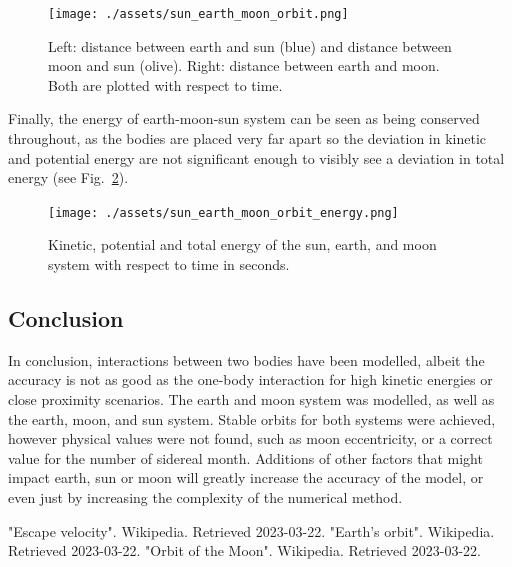 \documentclass[hyphens,twocolumn,nobalancelastpage,aps,10pt,citeautoscript,longbibliography]{revtex4-2}
\begin{document}
\begin{figure}[htpb]
	\centering
	\texttt{[image: ./assets/sun\_earth\_moon\_orbit.png]}
	\caption{Left: distance between earth and sun (blue) and distance between
	moon and sun (olive). Right: distance between earth and moon. Both are
	plotted with respect to time.}%
	\label{fig:./assets/sun_earth_moon_orbit}
\end{figure}

Finally, the energy of earth-moon-sun system can be seen as being conserved
throughout, as the bodies are placed very far apart so the deviation in kinetic
and potential energy are not significant enough to visibly see a deviation in
total energy (see Fig.~\ref{fig:./assets/sun_earth_moon_orbit_energy}).

\begin{figure}[htpb]
	\centering
	\texttt{[image: ./assets/sun\_earth\_moon\_orbit\_energy.png]}
	\caption{Kinetic, potential and total energy of the sun, earth, and moon system
		with respect to time in seconds.}%
	\label{fig:./assets/sun_earth_moon_orbit_energy}
\end{figure}


\subsection{Conclusion}%
\label{sub:conclusion_2}

\noindent In conclusion, interactions between two bodies have been modelled,
albeit the accuracy is not as good as the one-body interaction for high kinetic
energies or close proximity scenarios. The earth and moon system was modelled,
as well as the earth, moon, and sun system. Stable orbits for both systems were
achieved, however physical values were not found, such as moon eccentricity, or
a correct value for the number of sidereal month. Additions of other factors
that might impact earth, sun or moon will greatly increase the accuracy of the
model, or even just by increasing the complexity of the numerical method.

\begin{thebibliography}{2}

	 "Escape velocity". Wikipedia. Retrieved 2023-03-22.
	 "Earth's orbit". Wikipedia. Retrieved 2023-03-22.
	 "Orbit of the Moon". Wikipedia. Retrieved 2023-03-22.

\end{thebibliography}
\end{document}
